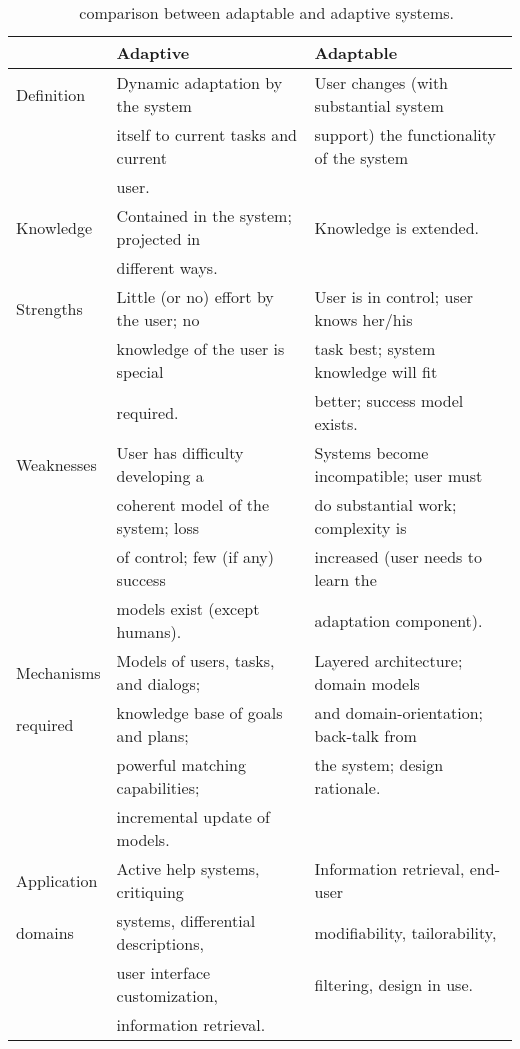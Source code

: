 \begin{table}
 \caption{~\citet{fischer_user_2001} comparison between adaptable and adaptive systems.}
 \label{tbl:fischer}
 \footnotesize
 \centering
\begin{tabular}{l l l}
  \hline
			& \textbf{Adaptive} 			& \textbf{Adaptable}\\
  \hline
	Definition	& Dynamic adaptation by the system  	& User changes (with substantial system	\\
			& itself to current tasks and current 	& support) the functionality of the system\\
			& user.					& ~					\\
	Knowledge	& Contained in the system; projected in & Knowledge is extended.		\\
			& different ways.			& ~					\\ 
	Strengths	& Little (or no) effort by the user; no & User is in control; user knows her/his\\
			& knowledge of the user is special	& task best; system knowledge will fit 	\\
			& required.				& better; success model exists.		\\
	Weaknesses	& User has difficulty developing a 	& Systems become incompatible; user must\\
			& coherent model of the system; loss  	& do substantial work; complexity is 	\\
			& of control; few (if any) success	& increased (user needs to learn the 	\\
			& models exist (except humans).		& adaptation component). 		\\
	Mechanisms	& Models of users, tasks, and dialogs;	& Layered architecture; domain models 	\\
	required	& knowledge base of goals and plans;  	& and domain-orientation; back-talk from\\
			& powerful matching capabilities;  	& the system; design rationale.		\\
			& incremental update of models.		& ~ 					\\
	Application	& Active help systems, critiquing 	& Information retrieval, end-user	\\
	domains		& systems, differential descriptions, 	& modifiability, tailorability, 	\\
			& user interface customization, 	& filtering, design in use.		\\
			& information retrieval.		& ~					\\
  \hline
\end{tabular}
\end{table}

